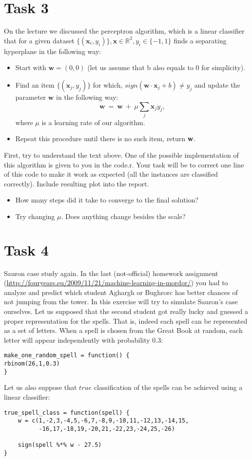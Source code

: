 \documentclass{article}
\begin{document}
\section*{Task 3}
On the lecture we discussed the perceptron algorithm, which is a linear classifier that for a given dataset $\{(\textbf{x}_i,y_i)\},\textbf{x} \in\mathbb{R}^{2}, y_i  \in \{-1, 1\}$ finds a separating hyperplane in the following way:
\begin{itemize}
\item Start with  $\textbf{w} = (0,0)$ (let us assume that b also equals to 0 for simplicity). 
\item Find an item  $\{(\textbf{x}_j,y_j)\}$ for which, $sign(\textbf{w}\cdot\textbf{x}_j + b)\neq y_j$ and update the parameter  $\textbf{w}$ in the following way: $$\textbf{w}~=~\textbf{w}~+~\mu\sum_{j}{\textbf{x}_j y_j},$$
where $\mu$ is a learning rate of our algorithm.
\item Repeat this procedure until there is no such item, return \textbf{w}.
\end{itemize}
First, try to understand the text above. One of the possible implementation of this algorithm is given to you in the code.r. Your task will be to correct one line of this code to make it work as expected (all the instances are classified correctly). Include resulting plot into the report. 
\begin{itemize}
\item How many steps did it take to converge to the final solution?
\item Try changing $\mu$. Does anything change besides the scale?
\end{itemize}
\section*{Task 4}
Sauron case study again. In the last (not-official) homework assignment (\url{http://fouryears.eu/2009/11/21/machine-learning-in-mordor/}) you had to analyze and predict which student Aghargh or Bughrorc has better chances of not jumping from the tower. In this exercise will try to simulate Sauron's case ourselves.
Let us supposed that the second student got really lucky and guessed a proper representation for the spells. That is, indeed each spell can be represented as a set of letters. When a spell is chosen from the Great Book at random, each letter will appear independently with probability 0.3:
\begin{lstlisting}
make_one_random_spell = function() {
rbinom(26,1,0.3)
}
\end{lstlisting}
Let us also suppose that $\textit{true}$ classification of the spells can be achieved using a linear classifier:
\begin{lstlisting}
true_spell_class = function(spell) {
    w = c(1,-2,3,-4,5,-6,7,-8,9,-10,11,-12,13,-14,15,
          -16,17,-18,19,-20,21,-22,23,-24,25,-26)
    
    sign(spell %*% w - 27.5)
}
\end{lstlisting}
\end{document}
